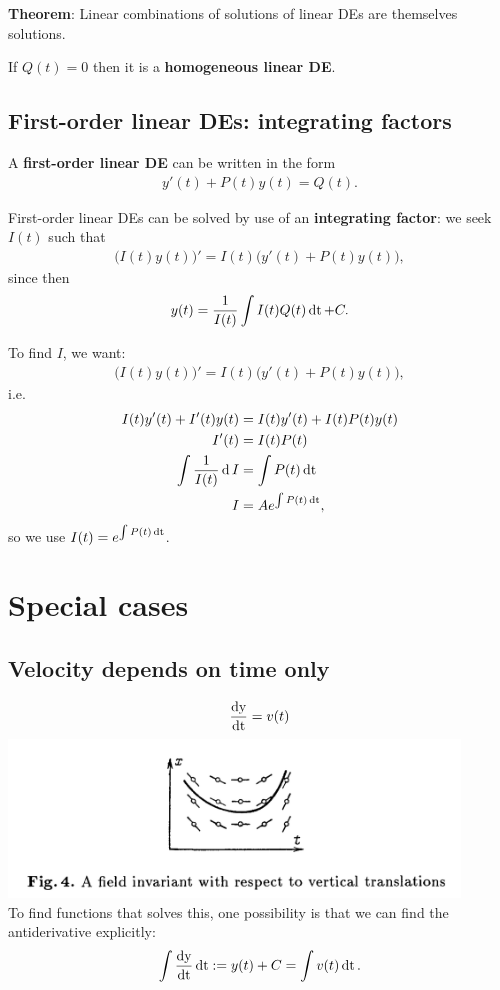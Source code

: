 \textbf{Theorem}: Linear combinations of solutions of linear DEs are themselves
solutions.

If $Q(t) = 0$ then it is a \textbf{homogeneous linear DE}.

\subsection{First-order linear DEs: integrating factors}
A \textbf{first-order linear DE} can be written in the form
\begin{align*}
  y'(t) + P(t)y(t) = Q(t).
\end{align*}

First-order linear DEs can be solved by use of an \textbf{integrating factor}:
we seek $I(t)$ such that
\begin{align*}
  \Big(I(t)y(t)\Big)' = I(t)\Big(y'(t) + P(t)y(t)\Big),
\end{align*}
since then
\begin{align*}
  y(t) = \frac{1}{I(t)}\int I(t)Q(t) \operatorname{\text{dt}} + C.
\end{align*}

To find $I$, we want:
\begin{align*}
  \Big(I(t)y(t)\Big)' = I(t)\Big(y'(t) + P(t)y(t)\Big),
\end{align*}
i.e.
\begin{align*}
  I(t)y'(t) + I'(t)y(t) &= I(t)y'(t) + I(t)P(t)y(t)\\
  I'(t) &= I(t)P(t)\\
  \int \frac{1}{I(t)} \operatorname{\text{d}} I &= \int P(t) \operatorname{\text{dt}}\\
                        I &= Ae^{\int P(t) \operatorname{\text{dt}}},
\end{align*}
so we use $I(t) = e^{\int P(t) \operatorname{\text{dt}}}$.


\section{Special cases}
\subsection{Velocity depends on time only}
\begin{align*}
  \frac{\operatorname{\text{dy}}}{\operatorname{\text{dt}}} = v(t)
\end{align*}
\includegraphics[width=340pt]{img/differential-equations-1-direction-field.png}\\
To find functions that solves this, one possibility is that we can find the
antiderivative explicitly:
\begin{align*}
  \int \frac{\operatorname{\text{dy}}}{\operatorname{\text{dt}}} \operatorname{\text{dt}} := y(t) + C = \int v(t) \operatorname{\text{dt}}.
\end{align*}


